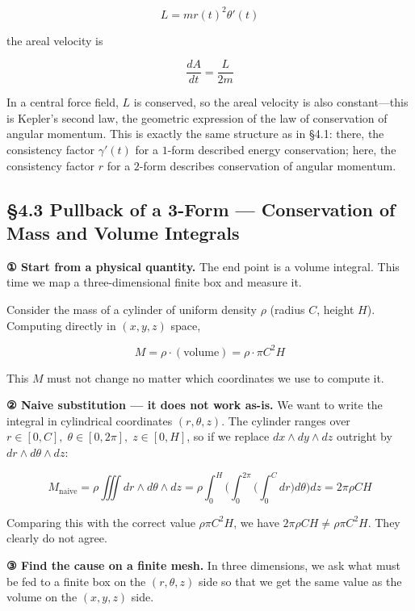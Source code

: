 \documentclass[a4paper,12pt,openany]{book}
\begin{document}
\[
L
=
m r(t)^2\theta'(t)
\]

the areal velocity is

\[\frac{dA}{dt} = \frac{L}{2m}\]

In a central force field, \(L\) is conserved, so the areal velocity is
also constant—this is Kepler's second law, the geometric expression of
the law of conservation of angular momentum. This is exactly the same
structure as in §4.1: there, the consistency factor \(\gamma'(t)\) for a
\(1\)-form described energy conservation; here, the consistency factor
\(r\) for a \(2\)-form describes conservation of angular momentum.

\par\vspace{0.35em}\par

\hypertarget{pullback-of-a-3-form-conservation-of-mass-and-volume-integrals}{%
\subsection{§4.3 Pullback of a 3-Form — Conservation of Mass and
Volume
Integrals}\label{pullback-of-a-3-form-conservation-of-mass-and-volume-integrals}}

\textbf{① Start from a physical quantity.} The end point is a volume
integral. This time we map a three-dimensional finite box and measure
it.

Consider the mass of a cylinder of uniform density \(\rho\) (radius
\(C\), height \(H\)). Computing directly in \((x,y,z)\) space,

\[M = \rho \cdot (\text{volume}) = \rho \cdot \pi C^2 H\]

This \(M\) must not change no matter which coordinates we use to compute
it.

\textbf{② Naive substitution — it does not work as-is.} We want to write
the integral in cylindrical coordinates \((r,\theta,z)\). The cylinder
ranges over \(r \in [0, C],\; \theta \in [0, 2\pi],\; z \in [0, H]\), so
if we replace \(dx \wedge dy \wedge dz\) outright by
\(dr \wedge d\theta \wedge dz\):

\[
M_{\text{naive}}
=
\rho \iiint dr\wedge d\theta\wedge dz
=
\rho
\int_0^H
\biggl(
  \int_0^{2\pi}
  \biggl(
    \int_0^C dr
  \biggr)
  d\theta
\biggr)
dz
=
2\pi\rho C H
\]

Comparing this with the correct value \(\rho \pi C^2 H\), we have
\(2\pi\rho C H \neq \rho \pi C^2 H\). They clearly do not agree.

\textbf{③ Find the cause on a finite mesh.} In three dimensions, we ask
what must be fed to a finite box on the \((r,\theta,z)\) side so that we
get the same value as the volume on the \((x,y,z)\) side.
\end{document}
